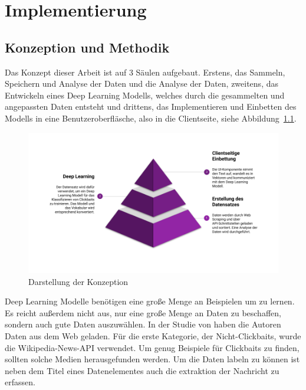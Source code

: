 \chapter{Implementierung}
\section{Konzeption und Methodik}


Das Konzept dieser Arbeit ist auf 3 Säulen aufgebaut. Erstens, das Sammeln, Speichern und Analyse der Daten und die Analyse der Daten, zweitens, das Entwickeln eines Deep Learning Modells, welches durch die gesammelten und angepassten Daten entsteht und drittens, das Implementieren und Einbetten des Modells in eine Benutzeroberfläsche, also in die Clientseite, siehe Abbildung~\ref{Kap5:Konzeption}.

\begin{figure}[H]
    \centering
    \includegraphics[width=15cm]{kapitel5/main_p.png}
    \caption[Darstellung der Konzeption]{Darstellung der Konzeption}
    \label{Kap5:Konzeption}
\end{figure}


Deep Learning Modelle benötigen eine große Menge an Beispielen um zu lernen. Es reicht außerdem nicht aus, nur eine große Menge an Daten zu beschaffen, sondern auch gute Daten auszuwählen. In der Studie von \cite*{Chakrabortya} haben die Autoren Daten aus dem Web geladen. Für die erste Kategorie, der Nicht-Clickbaits, wurde die Wikipedia-News-API verwendet. Um genug Beispiele für Clickbaits zu finden, sollten solche Medien herausgefunden werden. Um die Daten labeln zu können ist neben dem Titel eines Datenelementes auch die extraktion der Nachricht zu erfassen.

